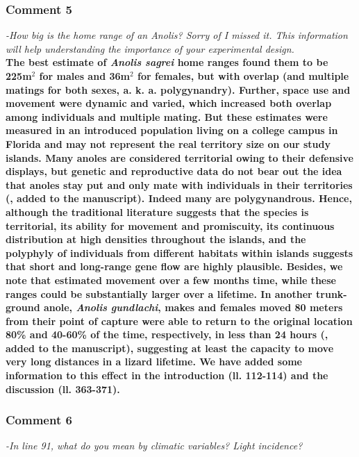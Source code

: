 \documentclass{article}
\begin{document}
	\subsubsection*{Comment 5}
	
	\textit{-How big is the home range of an Anolis? Sorry of I missed it. This information will help understanding the importance of your experimental design.}\\
	
	\textbf{The best estimate of \textit{Anolis sagrei} home ranges \citep{Kamath2018} found them to be 225m$^2$ for males and 36m$^2$ for females, but with overlap (and multiple matings for both sexes, a. k. a. polygynandry). Further, space use and movement were dynamic and varied, which increased both overlap among individuals and multiple mating. But these estimates were measured in an introduced population living on a college campus in Florida and may not represent the real territory size on our study islands. 
	Many anoles are considered territorial owing to their defensive displays, but genetic and reproductive data do not bear out the idea that anoles stay put and only mate with individuals in their territories (\citealt{Kamath2017a, Kamath2018a}, added to the manuscript). Indeed many are polygynandrous. Hence, although the traditional literature suggests that the species is territorial, its ability for movement and promiscuity, its continuous distribution at high densities throughout the islands, and the polyphyly of individuals from different habitats within islands suggests that short and long-range gene flow are highly plausible. Besides, we note that \citet{Kamath2018} estimated movement over a few months time, while these ranges could be substantially larger over a lifetime. In another trunk-ground anole, \textit{Anolis gundlachi}, makes and females moved 80 meters from their point of capture were able to return to the original location 80\% and 40-60\% of the time, respectively, in less than 24 hours (\citealt{Steinberg2017}, added to the manuscript), suggesting at least the capacity to move very long distances in a lizard lifetime. We have added some information to this effect in the introduction (ll. 112-114) and the discussion (ll. 363-371).} 
	
	\subsubsection*{Comment 6}
	
	\textit{-In line 91, what do you mean by climatic variables? Light incidence?}\\
	
\end{document}
